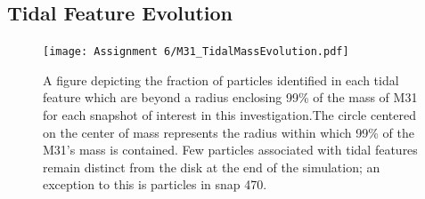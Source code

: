 \documentclass[fleqn,usenatbib]{mnras}
\begin{document}
\subsection{Tidal Feature Evolution}
\begin{figure}
	\texttt{[image: Assignment 6/M31\_TidalMassEvolution.pdf]}
    \caption{A figure depicting the fraction of particles identified in each tidal feature which are beyond a radius enclosing 99\% of the mass of M31 for each snapshot of interest in this investigation.The circle centered on the center of mass represents the radius within which 99\% of the M31's mass is contained. Few particles associated with tidal features remain distinct from the disk at the end of the simulation; an exception to this is particles in snap 470.}
    \label{fig:M31_TidalEvolution}
\end{figure}




\bsp	%
\label{lastpage}
\end{document}
